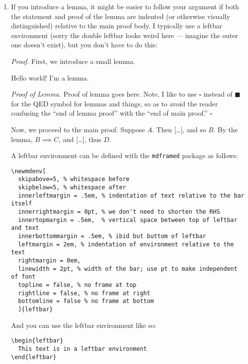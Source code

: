 \documentclass{fkpset}
\begin{document}
\begin{enumerate}[label=(\arabic*)]
\begin{leftbar}
\begin{proof}
        So $A \implies D$, as desired.
      \end{proof}
    \end{leftbar}
    Note, if the proof of each step is only a few lines long, then this isn't
    explicitly necessary. Use your own judgment, and I'll give you feedback if I
    think you should split up your argument more \texttt{:)}
  \item If you introduce a lemma, it might be easier to follow your argument if
    both the statement and proof of the lemma are indented (or otherwise
    visually distinguished) relative to the main proof body. I typically use a
    leftbar environment (sorry the double leftbar looks weird here --- imagine
    the outer one doesn't exist), but you don't have to do this:
    \begin{leftbar}
      \emph{Proof.} First, we introduce a small lemma.
      \begin{leftbar}\vspace{.5em}
        \begin{lemma}
          Hello world! I'm a lemma.
        \end{lemma}
        \emph{Proof of Lemma.} Proof of lemma goes here. Note, I like to use
        $\square$ instead of $\blacksquare$ for the QED symbol for lemmas
        and things, so as to avoid the reader confusing the ``end of lemma
        proof'' with the ``end of main proof.'' \hfill $\square$
      \end{leftbar}
      Now, we proceed to the main proof. Suppose $A$. Then [\ldots], and so
      $B$. By the lemma, $B \implies C$, and [\ldots], thus $D$.
    \end{leftbar}
    A leftbar environment can be defined with the \texttt{mdframed} package
    as follows:
    \begin{lstlisting}
\newmdenv[
  skipabove=5, % whitespace before
  skipbelow=5, % whitespace after
  innerleftmargin = .5em, % indentation of text relative to the bar itself
  innerrightmargin = 0pt, % we don't need to shorten the RHS
  innertopmargin = .5em,  % vertical space between top of leftbar and text
  innerbottommargin = .5em, % ibid but buttom of leftbar
  leftmargin = 2em, % indentation of environment relative to the text
  rightmargin = 0em,
  linewidth = 2pt, % width of the bar; use pt to make independent of font
  topline = false, % no frame at top
  rightline = false, % no frame at right
  bottomline = false % no frame at bottom
  ]{leftbar}\end{lstlisting}\vspace{-3em}
    And you can use the leftbar environment like so:
    \begin{lstlisting}
\begin{leftbar}
  This text is in a leftbar environment
\end{leftbar}\end{lstlisting}\vspace{-3em}
\end{enumerate}
\end{document}
